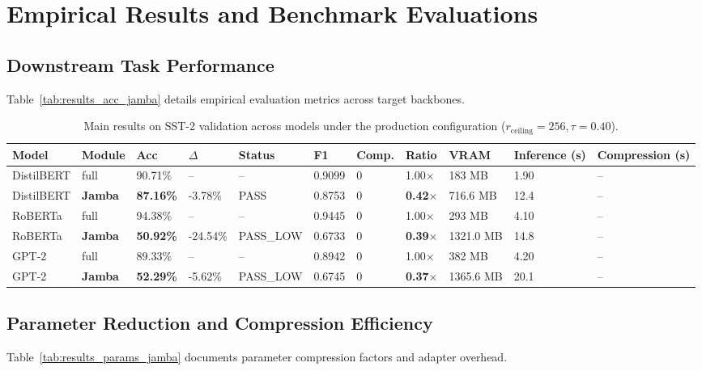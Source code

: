 \section{Empirical Results and Benchmark Evaluations}

\subsection{Downstream Task Performance}
Table~\ref{tab:results_acc_jamba} details empirical evaluation metrics across target backbones.

\begin{table}[t]
\centering
\small
\begin{tabular}{lllllllllll}
\toprule
\textbf{Model} & \textbf{Module} & \textbf{Acc} & \textbf{$\Delta$} & \textbf{Status} & \textbf{F1} & \textbf{Comp.} & \textbf{Ratio} & \textbf{VRAM} & \textbf{Inference (s)} & \textbf{Compression (s)} \\
\midrule
DistilBERT & full & 90.71\% & -- & -- & 0.9099 & 0 & 1.00$\times$ & 183 MB & 1.90 & -- \\
DistilBERT & \textbf{Jamba} & \textbf{87.16\%} & -3.78\% & PASS & 0.8753 & 0 & \textbf{0.42$\times$} & 716.6 MB & 12.4 & -- \\
RoBERTa & full & 94.38\% & -- & -- & 0.9445 & 0 & 1.00$\times$ & 293 MB & 4.10 & -- \\
RoBERTa & \textbf{Jamba} & \textbf{50.92\%} & -24.54\% & PASS\_LOW & 0.6733 & 0 & \textbf{0.39$\times$} & 1321.0 MB & 14.8 & -- \\
GPT-2 & full & 89.33\% & -- & -- & 0.8942 & 0 & 1.00$\times$ & 382 MB & 4.20 & -- \\
GPT-2 & \textbf{Jamba} & \textbf{52.29\%} & -5.62\% & PASS\_LOW & 0.6745 & 0 & \textbf{0.37$\times$} & 1365.6 MB & 20.1 & -- \\
\bottomrule
\end{tabular}
\caption{Main results on SST-2 validation across models under the production configuration ($r_{\mathrm{ceiling}}=256, \tau=0.40$).}
\label{tab:main_sst2}
\end{table}

\subsection{Parameter Reduction and Compression Efficiency}
Table~\ref{tab:results_params_jamba} documents parameter compression factors and adapter overhead.

